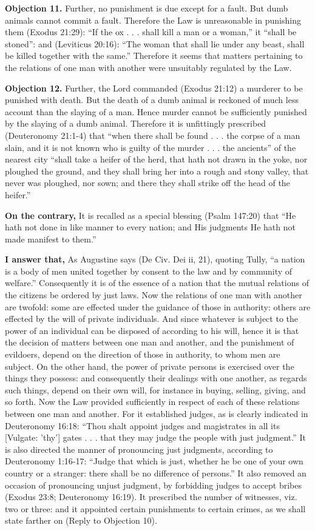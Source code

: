 \textbf{Objection 11.} Further, no punishment is due except for a fault. But dumb animals cannot commit a fault. Therefore the Law is unreasonable in punishing them (Exodus 21:29): ``If the ox . . . shall kill a man or a woman,'' it ``shall be stoned'': and (Leviticus 20:16): ``The woman that shall lie under any beast, shall be killed together with the same.'' Therefore it seems that matters pertaining to the relations of one man with another were unsuitably regulated by the Law.

\textbf{Objection 12.} Further, the Lord commanded (Exodus 21:12) a murderer to be punished with death. But the death of a dumb animal is reckoned of much less account than the slaying of a man. Hence murder cannot be sufficiently punished by the slaying of a dumb animal. Therefore it is unfittingly prescribed (Deuteronomy 21:1-4) that ``when there shall be found . . . the corpse of a man slain, and it is not known who is guilty of the murder . . . the ancients'' of the nearest city ``shall take a heifer of the herd, that hath not drawn in the yoke, nor ploughed the ground, and they shall bring her into a rough and stony valley, that never was ploughed, nor sown; and there they shall strike off the head of the heifer.''

\textbf{On the contrary,} It is recalled as a special blessing (Psalm 147:20) that ``He hath not done in like manner to every nation; and His judgments He hath not made manifest to them.''

\textbf{I answer that,} As Augustine says (De Civ. Dei ii, 21), quoting Tully, ``a nation is a body of men united together by consent to the law and by community of welfare.'' Consequently it is of the essence of a nation that the mutual relations of the citizens be ordered by just laws. Now the relations of one man with another are twofold: some are effected under the guidance of those in authority: others are effected by the will of private individuals. And since whatever is subject to the power of an individual can be disposed of according to his will, hence it is that the decision of matters between one man and another, and the punishment of evildoers, depend on the direction of those in authority, to whom men are subject. On the other hand, the power of private persons is exercised over the things they possess: and consequently their dealings with one another, as regards such things, depend on their own will, for instance in buying, selling, giving, and so forth. Now the Law provided sufficiently in respect of each of these relations between one man and another. For it established judges, as is clearly indicated in Deuteronomy 16:18: ``Thou shalt appoint judges and magistrates in all its [Vulgate: 'thy'] gates . . . that they may judge the people with just judgment.'' It is also directed the manner of pronouncing just judgments, according to Deuteronomy 1:16-17: ``Judge that which is just, whether he be one of your own country or a stranger: there shall be no difference of persons.'' It also removed an occasion of pronouncing unjust judgment, by forbidding judges to accept bribes (Exodus 23:8; Deuteronomy 16:19). It prescribed the number of witnesses, viz. two or three: and it appointed certain punishments to certain crimes, as we shall state farther on (Reply to Objection 10).

